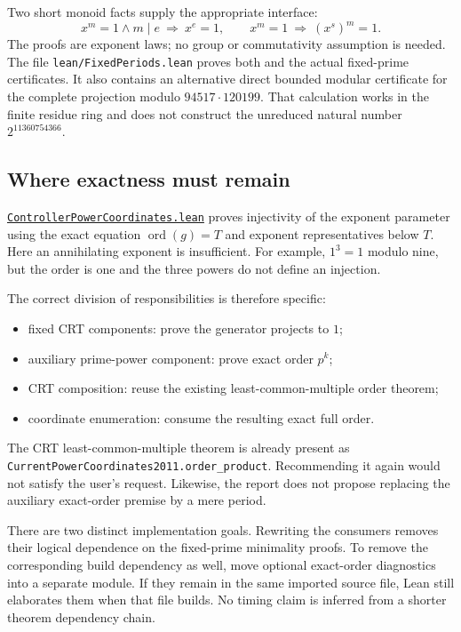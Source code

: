 \documentclass[11pt,letterpaper]{article}
\newcommand{\repobase}{https://github.com/VladimirReshetnikov/ProveIt/blob/9f35798db4a63c25e435fca14d75931144657d7e}
\newcommand{\leanfile}[1]{\href{\repobase/Computability/DiophantineConsistency/Lean/DiophantineConsistency/#1.lean}{\nolinkurl{#1.lean}}}
\newcommand{\ident}[1]{\nolinkurl{#1}}
\newcommand{\artifact}[1]{\nolinkurl{#1}}
\begin{document}
Two short monoid facts supply the appropriate interface:
\[
 x^m=1\land m\mid e\ \Longrightarrow\ x^e=1,
 \qquad
 x^m=1\ \Longrightarrow\ (x^s)^m=1.
\]
The proofs are exponent laws; no group or commutativity assumption is
needed. The file \artifact{lean/FixedPeriods.lean} proves both and the actual
fixed-prime certificates. It also contains an alternative direct bounded
modular certificate for the complete projection modulo $94517\cdot120199$.
That calculation works in the finite residue ring and does not construct
the unreduced natural number $2^{11360754366}$.

\subsection{Where exactness must remain}

\leanfile{ControllerPowerCoordinates} proves injectivity of the exponent
parameter using the exact equation $\operatorname{ord}(g)=T$ and exponent
representatives below $T$. Here an annihilating exponent is insufficient.
For example, $1^3=1$ modulo nine, but the order is one and the three powers
do not define an injection.

The correct division of responsibilities is therefore specific:
\begin{itemize}
\item fixed CRT components: prove the generator projects to $1$;
\item auxiliary prime-power component: prove exact order $p^k$;
\item CRT composition: reuse the existing least-common-multiple order theorem;
\item coordinate enumeration: consume the resulting exact full order.
\end{itemize}

The CRT least-common-multiple theorem is already present as
\ident{CurrentPowerCoordinates2011.order_product}. Recommending it again
would not satisfy the user's request. Likewise, the report does not propose
replacing the auxiliary exact-order premise by a mere period.

There are two distinct implementation goals. Rewriting the consumers removes
their logical dependence on the fixed-prime minimality proofs. To remove
the corresponding build dependency as well, move optional exact-order
diagnostics into a separate module. If they remain in the same imported
source file, Lean still elaborates them when that file builds. No timing
claim is inferred from a shorter theorem dependency chain.
\end{document}
